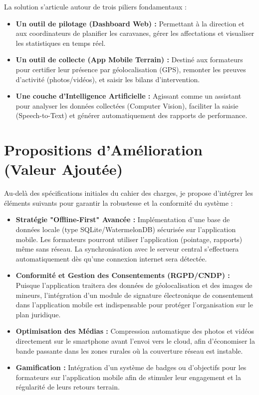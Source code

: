 \documentclass[12pt,a4paper]{article}
\begin{document}
La solution s'articule autour de trois piliers fondamentaux :
\begin{itemize}
    \item \textbf{Un outil de pilotage (Dashboard Web) :} Permettant à la direction et aux coordinateurs de planifier les caravanes, gérer les affectations et visualiser les statistiques en temps réel.
    \item \textbf{Un outil de collecte (App Mobile Terrain) :} Destiné aux formateurs pour certifier leur présence par géolocalisation (GPS), remonter les preuves d'activité (photos/vidéos), et saisir les bilans d'intervention.
    \item \textbf{Une couche d'Intelligence Artificielle :} Agissant comme un assistant pour analyser les données collectées (Computer Vision), faciliter la saisie (Speech-to-Text) et générer automatiquement des rapports de performance.
\end{itemize}

\section{Propositions d'Amélioration (Valeur Ajoutée)}
Au-delà des spécifications initiales du cahier des charges, je propose d'intégrer les éléments suivants pour garantir la robustesse et la conformité du système :

\begin{itemize}
    \item \textbf{Stratégie "Offline-First" Avancée :} Implémentation d'une base de données locale (type SQLite/WatermelonDB) sécurisée sur l'application mobile. Les formateurs pourront utiliser l'application (pointage, rapports) même sans réseau. La synchronisation avec le serveur central s'effectuera automatiquement dès qu'une connexion internet sera détectée.
    \item \textbf{Conformité et Gestion des Consentements (RGPD/CNDP) :} Puisque l'application traitera des données de géolocalisation et des images de mineurs, l'intégration d'un module de signature électronique de consentement dans l'application mobile est indispensable pour protéger l'organisation sur le plan juridique.
    \item \textbf{Optimisation des Médias :} Compression automatique des photos et vidéos directement sur le smartphone avant l'envoi vers le cloud, afin d'économiser la bande passante dans les zones rurales où la couverture réseau est instable.
    \item \textbf{Gamification :} Intégration d'un système de badges ou d'objectifs pour les formateurs sur l'application mobile afin de stimuler leur engagement et la régularité de leurs retours terrain.
\end{itemize}
\end{document}

